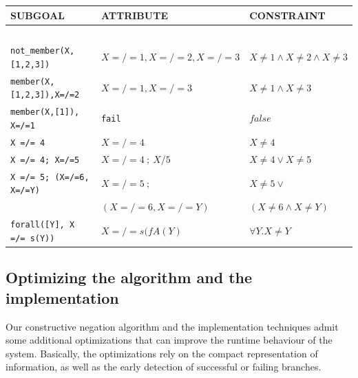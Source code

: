 \documentclass{tlp}
\begin{document}
\begin{center}
\begin{small}
\begin{tabular}{lll}
SUBGOAL & ATTRIBUTE & CONSTRAINT \\
\hline\hline
\ \\
{\tt not\_member(X,[1,2,3])}   &  $X=/=1,X=/=2,X=/=3$  & $X \neq 1 \wedge X \neq 2 \wedge X \neq 3$\\
{\tt member(X,[1,2,3]),X=/=2}  &  $X=/=1,X=/=3$        & $X \neq 1 \wedge X \neq 3$\\
{\tt member(X,[1]), X=/=1}     &  {\tt fail}           & $false$ \\
{\tt X =/= 4}                  & $X=/=4$               & $X \neq 4$ \\
{\tt X =/= 4; X=/=5}           & $X=/=4~ ;~ X/5$       & $X \neq 4 \vee X \neq 5$ \\
{\tt X =/= 5; (X=/=6, X=/=Y)}  & $X=/=5 ~;                 $    & $X \neq 5 \vee                           $\\
                               & $           (X=/=6, X=/=Y)$    & $              (X \neq 6 \wedge X \neq Y)$\\
{\tt forall([Y], X =/= s(Y))}  & $X=/=s(fA(Y)$         & $\forall Y. X \neq Y$ \\
\end{tabular}
\end{small}
\end{center}




\subsection{Optimizing the algorithm and the implementation}
\label{optimization}

Our constructive negation algorithm and the implementation techniques
admit some additional optimizations that can improve the runtime
behaviour of the system. Basically, the optimizations rely on the
compact representation of information, as well as the early detection
of successful or failing branches.
\bigskip
\end{document}
